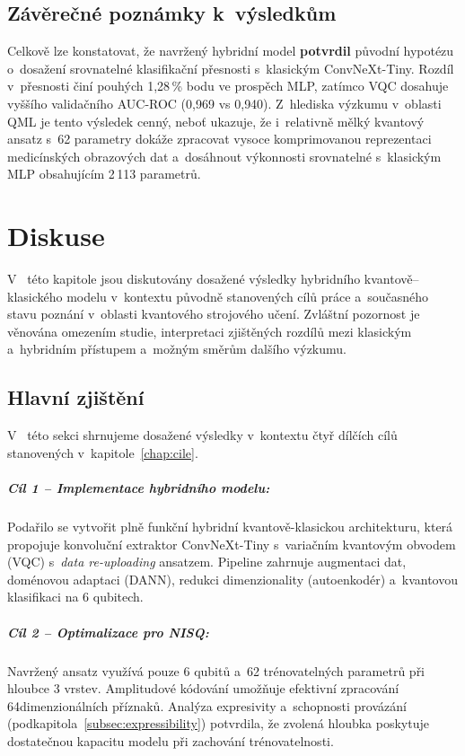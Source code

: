 \documentclass[12pt, a4paper]{report}
\begin{document}
\section{Závěrečné poznámky k~výsledkům}
Celkově lze konstatovat, že navržený hybridní model \textbf{potvrdil} původní hypotézu o~dosažení srovnatelné klasifikační přesnosti s~klasickým ConvNeXt-Tiny. Rozdíl v~přesnosti činí pouhých 1{,}28\,\% bodu ve prospěch MLP, zatímco VQC dosahuje vyššího validačního AUC-ROC (0{,}969 vs 0{,}940). Z~hlediska výzkumu v~oblasti QML je tento výsledek cenný, neboť ukazuje, že i~relativně mělký kvantový ansatz s~62 parametry dokáže zpracovat vysoce komprimovanou reprezentaci medicínských obrazových dat a~dosáhnout výkonnosti srovnatelné s~klasickým MLP obsahujícím 2\,113 parametrů. 

\chapter{Diskuse} \label{chap:diskuse}

V ~této kapitole jsou diskutovány dosažené výsledky hybridního kvantově–klasického modelu v~kontextu původně stanovených cílů práce a~současného stavu poznání v~oblasti kvantového strojového učení. Zvláštní pozornost je věnována omezením studie, interpretaci zjištěných rozdílů mezi klasickým a~hybridním přístupem a~možným směrům dalšího výzkumu.

\section{Hlavní zjištění}

V ~této sekci shrnujeme dosažené výsledky v~kontextu čtyř dílčích cílů stanovených v~kapitole~\ref{chap:cile}.

\paragraph{Cíl 1 -- Implementace hybridního modelu:} Podařilo se vytvořit plně funkční hybridní kvantově-klasickou architekturu, která propojuje konvoluční extraktor ConvNeXt-Tiny s~variačním kvantovým obvodem (VQC) s~\textit{data re-uploading} ansatzem. Pipeline zahrnuje augmentaci dat, doménovou adaptaci (DANN), redukci dimenzionality (autoenkodér) a~kvantovou klasifikaci na 6 qubitech.

\paragraph{Cíl 2 -- Optimalizace pro NISQ:} Navržený ansatz využívá pouze 6 qubitů a~62 trénovatelných parametrů při hloubce 3 vrstev. Amplitudové kódování umožňuje efektivní zpracování 64dimenzionálních příznaků. Analýza expresivity a~schopnosti provázání (podkapitola~\ref{subsec:expressibility}) potvrdila, že zvolená hloubka poskytuje dostatečnou kapacitu modelu při zachování trénovatelnosti.
\end{document}

